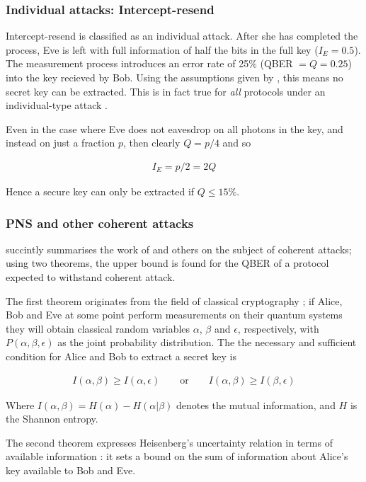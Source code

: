 \documentclass[paper=a4, fontsize=11pt]{scrartcl} %
\numberwithin{equation}{section} %
\numberwithin{figure}{section} %
\numberwithin{table}{section} %
\begin{document}
\subsubsection{Individual attacks: Intercept-resend}
Intercept-resend is classified as an individual attack.
After she has completed the process, Eve is left with full information of half the bits in the full key ($I_E = 0.5$).
The measurement process introduces an error rate of 25\% (QBER $= Q = 0.25$)
into the key recieved by Bob. Using the assumptions given by \citet{csiszarAssump},
this means no secret key can be extracted. This is in fact true for \textit{all} protocols under an individual-type
attack \citep{reviewScariani}.

Even in the case where Eve does not eavesdrop on all photons in the key, and instead on just a fraction $p$,
then clearly $Q = p/4$ and so

\begin{align}
I_E	= p/2 = 2Q
\end{align}

Hence a secure key can only be extracted if $Q \leq 15\%$. \citep{qber15proof}

\subsubsection{PNS and other coherent attacks}
\citet{gisin2002} succintly summarises the work of \citet{proofBB84} and others
on the subject of coherent attacks; using two theorems, the upper bound is found for the QBER
of a protocol expected to withstand coherent attack.

The first theorem originates from the field of classical
cryptography \citep{csiszarAssump}; if Alice, Bob and Eve
at some point perform measurements on their quantum systems
they will obtain classical random variables $\alpha$, $\beta$
and $\epsilon$, respectively, with $P(\alpha, \beta, \epsilon)$ as the
joint probability distribution. The the necessary and sufficient condition
for Alice and Bob to extract a secret key is

\begin{align}
	I(\alpha, \beta) \geq I(\alpha, \epsilon)
	\qquad
	\mathrm{or}
	\qquad
	I(\alpha, \beta) \geq I(\beta, \epsilon)
\end{align}

Where $I(\alpha, \beta) = H(\alpha) - H(\alpha | \beta)$ denotes the mutual information,
and $H$ is the Shannon entropy.

The second theorem expresses Heisenberg's uncertainty relation in terms of available information
\citep{hall1995}: it sets a bound on the sum of information about Alice's key available to Bob
and Eve.
\end{document}
